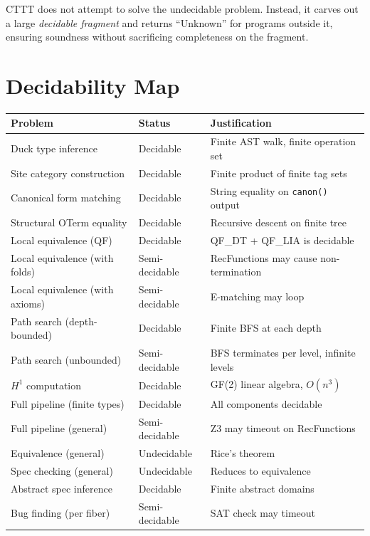 \documentclass[11pt,a4paper]{report}
\theoremstyle{definition}
\theoremstyle{plain}
\newcommand{\Hone}{H^1}
\begin{document}
CTTT does not attempt to solve the undecidable problem.  Instead, it
carves out a large \emph{decidable fragment} and returns ``Unknown''
for programs outside it, ensuring soundness without sacrificing
completeness on the fragment.

\section{Decidability Map}

\begin{center}
\small
\begin{longtable}{p{5cm} l p{5cm}}
  \toprule
  \textbf{Problem} & \textbf{Status} & \textbf{Justification} \\
  \midrule
  \endhead
  Duck type inference &
    Decidable &
    Finite AST walk, finite operation set \\
  Site category construction &
    Decidable &
    Finite product of finite tag sets \\
  Canonical form matching &
    Decidable &
    String equality on \texttt{canon()} output \\
  Structural OTerm equality &
    Decidable &
    Recursive descent on finite tree \\
  Local equivalence (QF) &
    Decidable &
    QF\_DT + QF\_LIA is decidable \\
  Local equivalence (with folds) &
    Semi-decidable &
    RecFunctions may cause non-termination \\
  Local equivalence (with axioms) &
    Semi-decidable &
    E-matching may loop \\
  Path search (depth-bounded) &
    Decidable &
    Finite BFS at each depth \\
  Path search (unbounded) &
    Semi-decidable &
    BFS terminates per level, infinite levels \\
  $\Hone$ computation &
    Decidable &
    GF(2) linear algebra, $O(n^3)$ \\
  Full pipeline (finite types) &
    Decidable &
    All components decidable \\
  Full pipeline (general) &
    Semi-decidable &
    Z3 may timeout on RecFunctions \\
  Equivalence (general) &
    Undecidable &
    Rice's theorem \\
  Spec checking (general) &
    Undecidable &
    Reduces to equivalence \\
  Abstract spec inference &
    Decidable &
    Finite abstract domains \\
  Bug finding (per fiber) &
    Semi-decidable &
    SAT check may timeout \\
  \bottomrule
\end{longtable}
\end{center}
\end{document}
